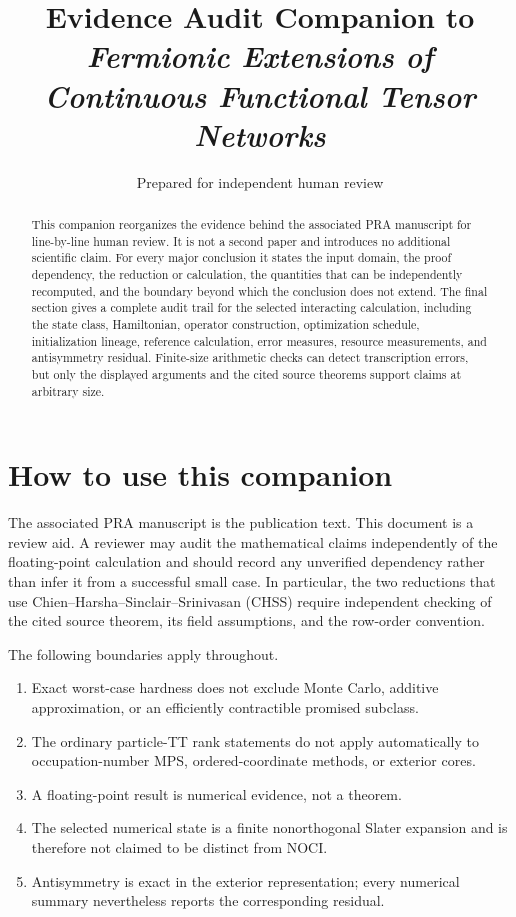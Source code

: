 \documentclass[11pt]{article}
\title{Evidence Audit Companion to\\
\emph{Fermionic Extensions of Continuous Functional Tensor Networks}}
\author{Prepared for independent human review}
\date{}
\theoremstyle{definition}
\begin{document}
\maketitle

\begin{abstract}
This companion reorganizes the evidence behind the associated PRA manuscript
for line-by-line human review.  It is not a second paper and introduces no
additional scientific claim.  For every major conclusion it states the input
domain, the proof dependency, the reduction or calculation, the quantities
that can be independently recomputed, and the boundary beyond which the
conclusion does not extend.  The final section gives a complete audit trail for
the selected interacting calculation, including the state class, Hamiltonian,
operator construction, optimization schedule, initialization lineage,
reference calculation, error measures, resource measurements, and
antisymmetry residual.  Finite-size arithmetic checks can detect transcription
errors, but only the displayed arguments and the cited source theorems support
claims at arbitrary size.
\end{abstract}

\tableofcontents

\section{How to use this companion}

The associated PRA manuscript is the publication text.  This document is a
review aid.  A reviewer may audit the mathematical claims independently of the
floating-point calculation and should record any unverified dependency rather
than infer it from a successful small case.  In particular, the two reductions
that use Chien--Harsha--Sinclair--Srinivasan (CHSS)
\cite{ChienHarshaSinclairSrinivasan2011NoncommDet} require independent checking
of the cited source theorem, its field assumptions, and the row-order
convention.

The following boundaries apply throughout.
\begin{enumerate}[leftmargin=*,itemsep=2pt]
\item Exact worst-case hardness does not exclude Monte Carlo, additive
  approximation, or an efficiently contractible promised subclass.
\item The ordinary particle-TT rank statements do not apply automatically to
  occupation-number MPS, ordered-coordinate methods, or exterior cores.
\item A floating-point result is numerical evidence, not a theorem.
\item The selected numerical state is a finite nonorthogonal Slater expansion
  and is therefore not claimed to be distinct from NOCI.
\item Antisymmetry is exact in the exterior representation; every numerical
  summary nevertheless reports the corresponding residual.
\end{enumerate}
\end{document}
